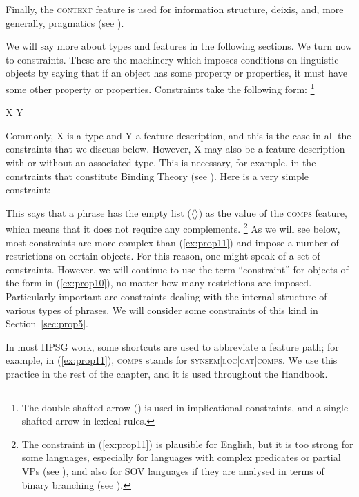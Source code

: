 \documentclass[output=paper
	        ,collection
	        ,collectionchapter
 	        ,biblatex
                ,babelshorthands
                ,newtxmath
                ,draftmode
                ,colorlinks, citecolor=brown
]{langscibook}
\begin{document}
Finally, the \textsc{context} feature is used for information structure, deixis, and, more generally, pragmatics (see ).

We will say more about types and features in the following sections. We turn now to constraints. These are the machinery which imposes conditions on linguistic objects by saying that if an object has some property or properties, it must have some other property or properties. Constraints take the following form:%
%
\footnote{The double-shafted arrow (\isi{\impl}) is used in implicational constraints, and a single shafted arrow \isi{$\mapsto$} in lexical rules.}
%

\ea\label{ex:prop10}
X \impl Y
\z

\noindent
Commonly, X is a type and Y a feature description, and this is the case in all the constraints that we discuss below. However, X may also be a feature description with or without an associated type. This is necessary, for example, in the constraints that constitute Binding Theory (see ). Here is a very simple constraint:

\ea
\label{ex:prop11}
\label{ex-phrase-coonstraint}
 
\z

\noindent
This says that a phrase has the empty list ($\langle \rangle$) as the value of the \textsc{comps} feature, which means that it does not require any complements.%
%
\footnote{The constraint in (\ref{ex:prop11}) is plausible for English, but it is too strong for some languages, especially for languages with complex predicates or partial VPs (see ), and also for SOV languages if they are analysed in terms of binary branching (see ).}
%
As we will see below, most constraints are more complex than (\ref{ex:prop11}) and impose a number of restrictions on certain objects. For this reason, one might speak of a set of constraints. However, we will continue to use the term ``constraint'' for objects of the form in (\ref{ex:prop10}), no matter how many restrictions are imposed. Particularly important are constraints dealing with the internal structure of various types of phrases. We will consider some constraints of this kind in Section~\ref{sec:prop5}.

In most HPSG work, some shortcuts are used to abbreviate a feature path; for example, in (\ref{ex:prop11}), \textsc{comps} stands for \textsc{synsem|loc|cat|comps}. We use this practice in the rest of the chapter, and it is used throughout the Handbook.
\end{document}
